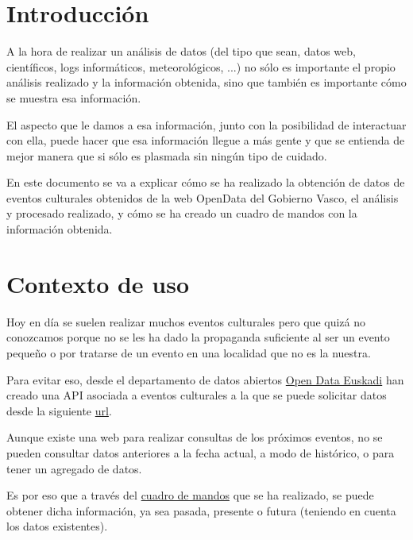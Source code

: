 \documentclass{\ClassPath/viu-tfm-template}
\begin{document}
    \graphicspath{{../../VIU_TFM_LaTeX_template/}}

    \coverpage

    \tableofcontents

\chapter{Introducción}

A la hora de realizar un análisis de datos (del tipo que sean, datos web, científicos, logs informáticos, meteorológicos, ...) no sólo es importante el propio análisis realizado y la información obtenida, sino que también es importante cómo se muestra esa información.

El aspecto que le damos a esa información, junto con la posibilidad de interactuar con ella, puede hacer que esa información llegue a más gente y que se entienda de mejor manera que si sólo es plasmada sin ningún tipo de cuidado.

En este documento se va a explicar cómo se ha realizado la obtención de datos de eventos culturales obtenidos de la web OpenData del Gobierno Vasco, el análisis y procesado realizado, y cómo se ha creado un cuadro de mandos con la información obtenida.

\chapter{Contexto de uso}

Hoy en día se suelen realizar muchos eventos culturales pero que quizá no conozcamos porque no se les ha dado la propaganda suficiente al ser un evento pequeño o por tratarse de un evento en una localidad que no es la nuestra.

Para evitar eso, desde el departamento de datos abiertos \href{https://www.opendata.euskadi.eus/inicio/}{Open Data Euskadi} han creado una API asociada a eventos culturales a la que se puede solicitar datos desde la siguiente \href{https://www.opendata.euskadi.eus/api-culture/?api=culture_events}{url}.

Aunque existe una web para realizar consultas de los próximos eventos, no se pueden consultar datos anteriores a la fecha actual, a modo de histórico, o para tener un agregado de datos.

Es por eso que a través del \href{https://datastudio.google.com/reporting/2322c44e-ad75-4243-a4a5-257be6d754bf/page/9AT6C}{cuadro de mandos} que se ha realizado, se puede obtener dicha información, ya sea pasada, presente o futura (teniendo en cuenta los datos existentes).
\end{document}
